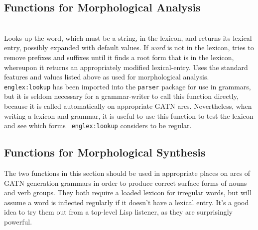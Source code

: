 \documentclass{book}
\begin{document}
\subsection{Functions for Morphological Analysis}

 \\
Looks up the word, which must be a string, in the lexicon, and returns its lexical-entry, possibly
expanded with default values.  If {\it word} is not in the lexicon, tries to remove prefixes and
suffixes until it finds a root form that is in the lexicon, whereupon it returns an appropriately
modified lexical-entry.  Uses the standard features and values listed above as used for
morphological analysis. {\tt englex:lookup} has been imported into the {\tt parser} package for use
in grammars, but it is seldom necessary for a grammar-writer to call this function directly, because
it is called automatically on appropriate GATN arcs.  Nevertheless, when writing a lexicon and
grammar, it is useful to use this function to test the lexicon and see which forms {\tt
englex:lookup} considers to be regular.

\subsection{Functions for Morphological Synthesis}

The two functions in this section should be used in appropriate places on arcs of GATN generation
grammars in order to produce correct surface forms of nouns and verb groups.  They both require a
loaded lexicon for irregular words, but will assume a word is inflected regularly if it doesn't have
a lexical entry.  It's a good idea to try them out from a top-level Lisp listener, as they are
surprisingly powerful.
\end{document}
